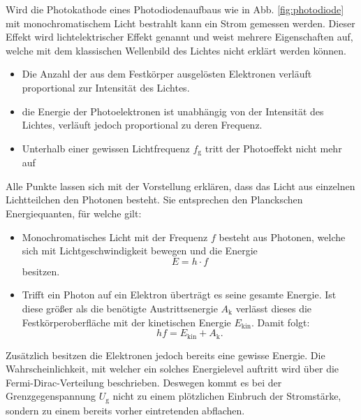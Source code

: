  Wird die Photokathode eines Photodiodenaufbaus wie in Abb. \ref{fig:photodiode}
 mit monochromatischem Licht bestrahlt kann ein Strom gemessen werden.
 Dieser Effekt wird lichtelektrischer Effekt genannt und weist mehrere Eigenschaften auf, welche mit dem
 klassischen Wellenbild des Lichtes nicht erklärt werden können.
\begin{itemize}
  \item Die Anzahl der aus dem Festkörper ausgelösten Elektronen verläuft
  proportional zur Intensität des Lichtes.
  \item die Energie der Photoelektronen ist unabhängig von der Intensität des
  Lichtes, verläuft jedoch proportional zu deren Frequenz.
  \item Unterhalb einer gewissen Lichtfrequenz $f_\text{g}$ tritt der Photoeffekt nicht mehr auf
\end{itemize}
Alle Punkte lassen sich mit der Vorstellung erklären, dass das Licht aus einzelnen
Lichtteilchen den Photonen besteht. Sie entsprechen den Planckschen Energiequanten,
für welche gilt:
\begin{itemize}
  \item Monochromatisches Licht mit der Frequenz $f$ besteht aus Photonen,
  welche sich mit Lichtgeschwindigkeit bewegen und die Energie
  \begin{equation}
    E = h \cdot f \label{ITSAPLANCK}
    \end{equation}
    besitzen.
    \item Trifft ein Photon auf ein Elektron überträgt es seine gesamte Energie.
    Ist diese größer als die benötigte Austrittsenergie $A_\text{k}$ verlässt
    dieses die Festkörperoberfläche mit der kinetischen Energie $E_\text{kin}$.
    Damit folgt:
    \begin{equation}
      h f = E_\text{kin} +A_\text{k}\text{.}\label{STEVE0ne:---3}
    \end{equation}
\end{itemize}
Zusätzlich besitzen die Elektronen jedoch bereits eine gewisse Energie. Die Wahrscheinlichkeit,
mit welcher ein solches Energielevel auftritt wird über die Fermi-Dirac-Verteilung
beschrieben. Deswegen kommt es bei der Grenzgegenspannung $U_\text{g}$ nicht zu
einem plötzlichen Einbruch der Stromstärke, sondern zu einem bereits vorher eintretenden abflachen.
